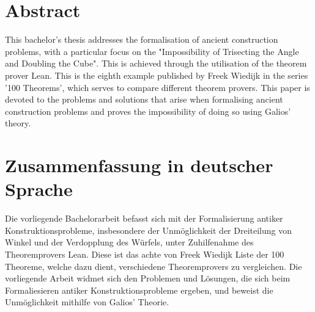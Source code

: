 \section*{Abstract}
This bachelor's thesis addresses the formalisation of ancient construction problems, with a particular focus on the "Impossibility of Trisecting the Angle and Doubling the Cube". This is achieved through the utilisation of the theorem prover Lean. This is the eighth example published by Freek Wiedijk in the series '100 Theorems', which serves to compare different theorem provers.
This paper is devoted to the problems and solutions that arise when formalising ancient construction problems and proves the impossibility of doing so using Galios' theory.
\section*{Zusammenfassung in deutscher Sprache}
Die vorliegende Bachelorarbeit befasst sich mit der Formalisierung antiker Konstruktionsprobleme, insbesondere der Unmöglichkeit der Dreiteilung von Winkel und der Verdopplung des Würfels, unter Zuhilfenahme des Theoremprovers Lean. Diese ist das achte von Freek Wiedijk Liste der 100 Theoreme, welche dazu dient, verschiedene Theoremprovers zu vergleichen.
Die vorliegende Arbeit widmet sich den Problemen und Lösungen, die sich beim Formaliesieren antiker Konstruktionsprobleme ergeben, und beweist die Unmöglichkeit mithilfe von Galios' Theorie.